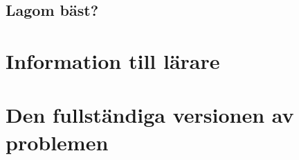 \documentclass[11pt,a4paper]{article}
\begin{document}
    \subsection{Lagom bäst?}
        
        

\newpage
\begin{thebibliography}{3}
    
\end{thebibliography}

\newpage
{}
\appendix

\section{Information till lärare}

\section{Den fullständiga versionen av problemen}
\end{document}

